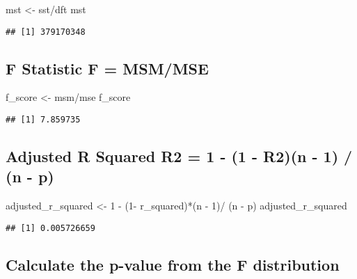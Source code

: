 \documentclass[
]{article}
\newenvironment{Shaded}{\begin{snugshade}}{\end{snugshade}}
\newcommand{\DecValTok}[1]{\textcolor[rgb]{0.00,0.00,0.81}{#1}}
\newcommand{\NormalTok}[1]{#1}
\newcommand{\OtherTok}[1]{\textcolor[rgb]{0.56,0.35,0.01}{#1}}
\newcommand{\SpecialCharTok}[1]{\textcolor[rgb]{0.00,0.00,0.00}{#1}}
\begin{document}
\begin{Shaded}
\begin{Highlighting}[]
\NormalTok{mst }\OtherTok{\textless{}{-}}\NormalTok{ sst}\SpecialCharTok{/}\NormalTok{dft}
\NormalTok{mst}
\end{Highlighting}
\end{Shaded}

\begin{verbatim}
## [1] 379170348
\end{verbatim}

\hypertarget{f-statistic-f-msmmse}{%
\subsection{F Statistic F = MSM/MSE}\label{f-statistic-f-msmmse}}

\begin{Shaded}
\begin{Highlighting}[]
\NormalTok{f\_score }\OtherTok{\textless{}{-}}\NormalTok{ msm}\SpecialCharTok{/}\NormalTok{mse}
\NormalTok{f\_score}
\end{Highlighting}
\end{Shaded}

\begin{verbatim}
## [1] 7.859735
\end{verbatim}

\hypertarget{adjusted-r-squared-r2-1---1---r2n---1-n---p}{%
\subsection{Adjusted R Squared R2 = 1 - (1 - R2)(n - 1) / (n -
p)}\label{adjusted-r-squared-r2-1---1---r2n---1-n---p}}

\begin{Shaded}
\begin{Highlighting}[]
\NormalTok{adjusted\_r\_squared }\OtherTok{\textless{}{-}} \DecValTok{1} \SpecialCharTok{{-}}\NormalTok{ (}\DecValTok{1}\SpecialCharTok{{-}}\NormalTok{ r\_squared)}\SpecialCharTok{*}\NormalTok{(n }\SpecialCharTok{{-}} \DecValTok{1}\NormalTok{)}\SpecialCharTok{/}\NormalTok{ (n }\SpecialCharTok{{-}}\NormalTok{ p)}
\NormalTok{adjusted\_r\_squared}
\end{Highlighting}
\end{Shaded}

\begin{verbatim}
## [1] 0.005726659
\end{verbatim}

\hypertarget{calculate-the-p-value-from-the-f-distribution}{%
\subsection{Calculate the p-value from the F
distribution}\label{calculate-the-p-value-from-the-f-distribution}}
\end{document}
